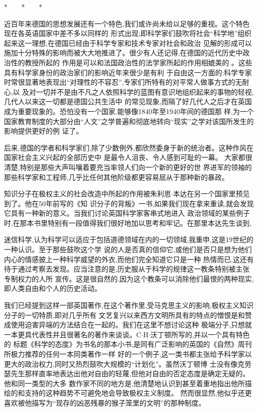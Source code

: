 ﻿\documentclass[12pt]{article}
\begin{document}
*　　*　　*

近百年来德国的思想发展还有一个特色,我们或许尚未给以足够的重视。这个特色现在各英语国家中差不多以同样的
形式出现;即科学家们鼓吹将社会``科学地''组织起来这一理想,在德国已经由于科学专家和技术专家对社会和政治
见解的形成可以施加十分特殊的影响而被大大地推进了。很少有人还记得,在德国的近代历史中政治性的教授所起的
作用是可以和法国政治性的法学家所起的作用相媲美的 。这些具有科学家身份的政治家们的影响近年来很少是有利
于自由这一方面的:科学专家时常很显著地表现出``对理性的不容忍'',专家们所特有的对平常人做事方式的无耐心,以
及对一切并不是由不凡之人依照科学的蓝图有意识地组织起来的事物的轻视,几代人以来这一切都是德国公共生活中
的常见现象,而隔了好几代人之后才在英国成为重要现象的。恐怕没有一个国家,能够像1840年至1940年间的德国那
样,为一个国家教育制度的大部分由``人文''之学普遍和彻底地转向``现实''之学对该国所发生的影响提供更好的例
证了。

后来,德国的学者和科学家们,除了少数例外,都欣然委身于新的统治者。这种作风在国家社会主义兴起的全部历史中
是最令人沮丧、令人感到可耻的一幕。 大家都很清楚,特别是那些大声叫嚷着要充当率领人们向一个新的更好的世
界进军的领袖的那些科学家和工程师,几乎比任何其他阶级都更容易屈从于那种新的暴政。

知识分子在极权主义的社会改造中所起的作用被朱利思$\cdot$本达在另一个国家里预见到了。他在50年前写的《知
识分子的背叛》一书,如果我们现在拿来重读,就会发现它具有一种新的意义。当我们讨论英国科学家客串式地进入
政治领域的某些例子时,在那本书里特别有一段值得我们很好地加以思考和牢记。在那里本达先生谈到,

迷信科学,认为科学可以适应于包括道德领域在内的一切领域,我重申,这是19世纪的一种认识。至于那些鼓吹这个学
说的人是否真的信仰它,或他们是否只是想为他们内心的情感披上一种科学威望的外衣,而他们完全知道它只是一种
热情而已,这还有待于通过考察去发现。应当注意的是,历史服从于科学的规律这一教条特别被主张专制权力的人所
宣传。这是很自然的,因为这个教条可以消除他们最恨的两种现实,即人类自由和个人的历史活动。

我们已经提到这样一部英国著作,在这个著作里,受马克思主义的影响,极权主义知识分子的一切特质,即对几乎所有
文艺复兴以来西方文明所具有的特点的憎恨是和赞成使用迫害异端的方法结合在一起的。我们在这里不想讨论这种
极端分子,只想就一本更具代表性并且很著名的著作来谈谈。C$\cdot$H$\cdot$沃丁顿所写的,并以一个具有特色的
标题《科学的态度》为书名的那本小书,是同有广泛影响的英国的《自然》周刊所极力推荐的任何一本同类著作一样
好的一个例子,这一类书都主张给予科学家以更大的政治权力,同时又热烈鼓吹大规模的``计划化''。虽然沃丁顿博
士没有像克劳瑟先生那样直率地表达出他对自由的轻蔑,但他对自由的否定态度是确定无疑的。他和同一类型的大多
数作家不同的地方是,他清楚地认识到甚至着重地指出他所描绘的和支持的这种趋势不可避免地会导致极权主义制度。
然而很显然,他似乎还更喜欢被他描写为``现存的凶恶残暴的猴子笼里的文明''的那种制度。
\end{document}
